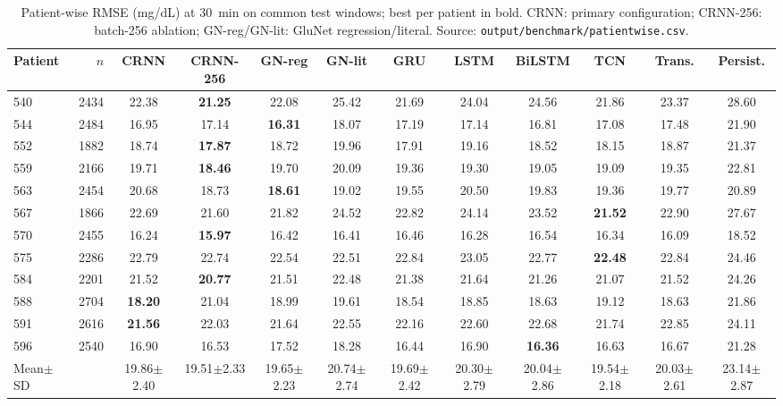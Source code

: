 \begin{table}[t]\centering
\caption{Patient-wise RMSE (mg/dL) at 30~min on common test windows; best per patient in bold. CRNN: primary configuration; CRNN-256: batch-256 ablation; GN-reg/GN-lit: GluNet regression/literal. Source: \texttt{output/benchmark/patientwise.csv}.}
\scriptsize\setlength{\tabcolsep}{3pt}
\begin{tabular}{lrcccccccccc}\toprule
Patient & $n$ & CRNN & CRNN-256 & GN-reg & GN-lit & GRU & LSTM & BiLSTM & TCN & Trans. & Persist.\\\midrule
540 & 2434 & 22.38 & \textbf{21.25} & 22.08 & 25.42 & 21.69 & 24.04 & 24.56 & 21.86 & 23.37 & 28.60\\
544 & 2484 & 16.95 & 17.14 & \textbf{16.31} & 18.07 & 17.19 & 17.14 & 16.81 & 17.08 & 17.48 & 21.90\\
552 & 1882 & 18.74 & \textbf{17.87} & 18.72 & 19.96 & 17.91 & 19.16 & 18.52 & 18.15 & 18.87 & 21.37\\
559 & 2166 & 19.71 & \textbf{18.46} & 19.70 & 20.09 & 19.36 & 19.30 & 19.05 & 19.09 & 19.35 & 22.81\\
563 & 2454 & 20.68 & 18.73 & \textbf{18.61} & 19.02 & 19.55 & 20.50 & 19.83 & 19.36 & 19.77 & 20.89\\
567 & 1866 & 22.69 & 21.60 & 21.82 & 24.52 & 22.82 & 24.14 & 23.52 & \textbf{21.52} & 22.90 & 27.67\\
570 & 2455 & 16.24 & \textbf{15.97} & 16.42 & 16.41 & 16.46 & 16.28 & 16.54 & 16.34 & 16.09 & 18.52\\
575 & 2286 & 22.79 & 22.74 & 22.54 & 22.51 & 22.84 & 23.05 & 22.77 & \textbf{22.48} & 22.84 & 24.46\\
584 & 2201 & 21.52 & \textbf{20.77} & 21.51 & 22.48 & 21.38 & 21.64 & 21.26 & 21.07 & 21.52 & 24.26\\
588 & 2704 & \textbf{18.20} & 21.04 & 18.99 & 19.61 & 18.54 & 18.85 & 18.63 & 19.12 & 18.63 & 21.86\\
591 & 2616 & \textbf{21.56} & 22.03 & 21.64 & 22.55 & 22.16 & 22.60 & 22.68 & 21.74 & 22.85 & 24.11\\
596 & 2540 & 16.90 & 16.53 & 17.52 & 18.28 & 16.44 & 16.90 & \textbf{16.36} & 16.63 & 16.67 & 21.28\\
\midrule
Mean$\pm$SD & & 19.86$\pm$2.40 & 19.51$\pm$2.33 & 19.65$\pm$2.23 & 20.74$\pm$2.74 & 19.69$\pm$2.42 & 20.30$\pm$2.79 & 20.04$\pm$2.86 & 19.54$\pm$2.18 & 20.03$\pm$2.61 & 23.14$\pm$2.87\\
\bottomrule
\end{tabular}\end{table}
